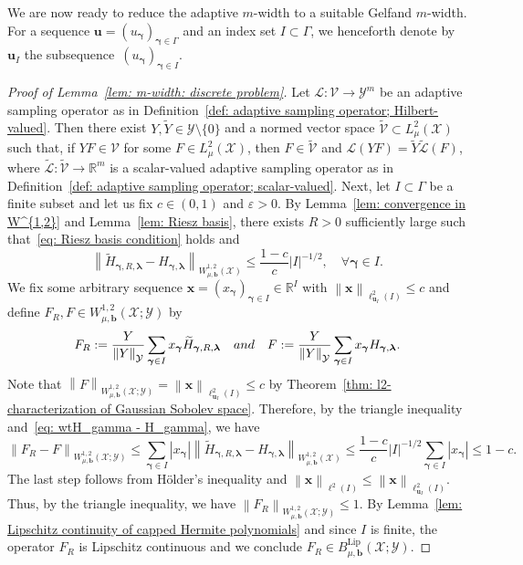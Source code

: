 \documentclass[namedate,webpdf]{ima-authoring-template-blank}
\newcommand*{\Lip}{\mathrm{Lip}}  %
\newcommand*{\nm}[1]{{\left\|#1\right \|}}
\newcommand{\abs}[1]{\left|#1\right|}
\numberwithin{counter}{section}
\numberwithin{equation}{section}
\theoremstyle{plain}
\theoremstyle{definition}
\newcommand*{\cL}{\mathcal{L}}
\newcommand*{\cV}{\mathcal{V}}
\newcommand*{\cX}{\mathcal{X}}
\newcommand*{\cY}{\mathcal{Y}}
\newcommand*{\bbR}{\mathbb{R}}
\newcommand*{\wtH}{\widetilde{H}}
\newcommand*{\wtY}{\widetilde{Y}}
\theoremstyle{thmstyletwo}
\begin{document}
We are now ready to reduce the adaptive \(m\)-width to a suitable Gelfand \(m\)-width.  For a sequence \( \bm{u} = (u_{\bm{\gamma}})_{\bm{\gamma} \in \Gamma} \) and an index set \( I \subset \Gamma \), we henceforth denote by \( \bm{u}_I \) the subsequence~\( (u_{\bm{\gamma}})_{\bm{\gamma} \in I} \).

\begin{proof}[Proof of Lemma~\ref{lem: m-width: discrete problem}]
    Let \(\cL: \cV \to \cY^m\) be an adaptive sampling operator as in Definition~\ref{def: adaptive sampling operator; Hilbert-valued}. Then there exist \(Y, \wtY \in \cY \setminus \{0\}\) and a normed vector space \(\widetilde{\cV} \subset L_{\mu}^2(\cX)\) such that, if \(Y F \in \cV\) for some \(F \in L_{\mu}^2(\cX)\), then \(F \in \widetilde{\cV}\) and \(\cL(Y F) = \wtY \widetilde{\cL}(F)\), where \(\widetilde{\cL}: \widetilde{\cV} \to \bbR^m\) is a scalar-valued adaptive sampling operator as in Definition~\ref{def: adaptive sampling operator; scalar-valued}.
    Next, let \(I \subset \Gamma\) be a finite subset and let us fix \(c \in (0, 1)\) and \(\varepsilon > 0\). By Lemma~\ref{lem: convergence in W^{1,2}} and Lemma~\ref{lem: Riesz basis}, there exists \(R > 0\) sufficiently large such that~\eqref{eq: Riesz basis condition} holds and 
    \begin{equation}\label{eq: wtH_gamma - H_gamma}
        \nm{\wtH_{\bm{\gamma}, R, \bm{\lambda}} - H_{\bm{\gamma}, \bm{\lambda}}}_{W_{\mu, \bm{b}}^{1,2}(\cX)} \leq \frac{1-c}{c} \abs{I}^{-1/2}, \quad \forall \bm{\gamma} \in I.
    \end{equation}
    We fix some arbitrary sequence \(\bm{x} = (x_{\bm{\gamma}})_{\bm{\gamma} \in I} \in \bbR^I\) with \(\nm{\bm{x}}_{\ell_{\bm{u}_I}^2(I)} \leq c\) and define \(F_R, F \in W_{\mu, \bm{b}}^{1,2}(\cX; \cY)\) by 
    \begin{equation}
    \label{eq: F_R}
        F_R := \frac{Y}{\nm{Y}_{\cY}} \sum_{\bm{\gamma} \in I} x_{\bm{\gamma}} \wtH_{\bm{\gamma}, R, \bm{\lambda}} 
        \quad \textup{and} \quad
        F := \frac{Y}{\nm{Y}_{\cY}} \sum_{\bm{\gamma} \in I} x_{\bm{\gamma}} H_{\bm{\gamma}, \bm{\lambda}}.
    \end{equation}
    Note that \(\nm{F}_{W_{\mu, \bm{b}}^{1,2}(\cX; \cY)} = \nm{\bm{x}}_{\ell_{\bm{u}_I}^2(I)} \leq c\) by Theorem~\ref{thm: l2-characterization of Gaussian Sobolev space}. Therefore, by the triangle inequality and~\eqref{eq: wtH_gamma - H_gamma}, we have
    \[
    \nm{F_R - F}_{W_{\mu, \bm{b}}^{1,2}(\cX; \cY)}
    \leq \sum_{\bm{\gamma} \in I} \abs{x_{\bm{\gamma}}} \nm{\wtH_{\bm{\gamma}, R, \bm{\lambda}} - H_{\bm{\gamma},\bm{\lambda}}}_{W_{\mu, \bm{b}}^{1,2}(\cX)} 
    \leq \frac{1-c}{c} \abs{I}^{-1/2}  \sum_{\bm{\gamma} \in I} \abs{x_{\bm{\gamma}}} 
    \leq 1-c.
    \]
    The last step follows from Hölder's inequality and \( \nm{\bm{x}}_{\ell^2(I)} \leq \nm{\bm{x}}_{\ell_{\bm{u}_I}^2(I)} \).
    Thus, by the triangle inequality, we have \(\nm{F_R}_{W_{\mu, \bm{b}}^{1,2}(\cX; \cY)} \leq 1\). By Lemma~\ref{lem: Lipschitz continuity of capped Hermite polynomials} and since \(I\) is finite, the operator \(F_R\) is Lipschitz continuous and we conclude \(F_R \in B_{\mu, \bm{b}}^{\Lip}(\cX; \cY)\).


\end{proof}
\end{document}
